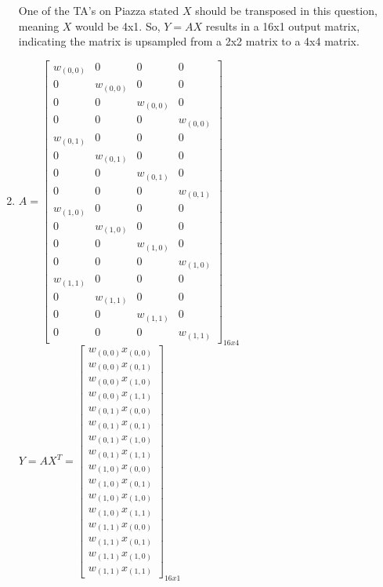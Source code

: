 \documentclass[11pt,english]{article}
\begin{document}
\begin{enumerate}
	One of the TA's on Piazza stated $X$ should be transposed in this question, meaning $X$ would be 4x1. So, $Y = AX$ results in a 16x1 output matrix, indicating the matrix is upsampled from a 2x2 matrix to a 4x4 matrix.
	
	\pagebreak
	\item $A = \begin{bmatrix}
	w_{(0, 0)} & 0 & 0 & 0 \\
	0 & w_{(0, 0)} & 0 & 0 \\
	0 & 0 & w_{(0, 0)} & 0 \\
	0 & 0 & 0 & w_{(0, 0)} \\
	w_{(0, 1)} & 0 & 0 & 0 \\
	0 & w_{(0, 1)} & 0 & 0 \\
	0 & 0 & w_{(0, 1)} & 0 \\
	0 & 0 & 0 & w_{(0, 1)} \\
	w_{(1, 0)} & 0 & 0 & 0 \\
	0 & w_{(1, 0)} & 0 & 0 \\
	0 & 0 & w_{(1, 0)} & 0 \\
	0 & 0 & 0 & w_{(1, 0)} \\
	w_{(1, 1)} & 0 & 0 & 0 \\
	0 & w_{(1, 1)} & 0 & 0 \\
	0 & 0 & w_{(1, 1)} & 0 \\
	0 & 0 & 0 & w_{(1, 1)}
	\end{bmatrix}_{16x4}$ \\
	$Y = AX^T = \begin{bmatrix}
	w_{(0, 0)}x_{(0, 0)} \\
	w_{(0, 0)}x_{(0, 1)} \\
	w_{(0, 0)}x_{(1, 0)} \\
	w_{(0, 0)}x_{(1, 1)} \\
	w_{(0, 1)}x_{(0, 0)} \\
	w_{(0, 1)}x_{(0, 1)} \\
	w_{(0, 1)}x_{(1, 0)} \\
	w_{(0, 1)}x_{(1, 1)} \\
	w_{(1, 0)}x_{(0, 0)} \\
	w_{(1, 0)}x_{(0, 1)} \\
	w_{(1, 0)}x_{(1, 0)} \\
	w_{(1, 0)}x_{(1, 1)} \\
	w_{(1, 1)}x_{(0, 0)} \\
	w_{(1, 1)}x_{(0, 1)} \\
	w_{(1, 1)}x_{(1, 0)} \\
	w_{(1, 1)}x_{(1, 1)}
	\end{bmatrix}_{16x1}$\\\\

\end{enumerate}
\end{document}
